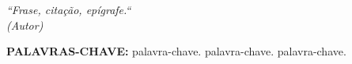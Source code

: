 \documentclass[
  12pt,		%
  a4paper,	%
  openright,%
  oneside,	%
  chapter=TITLE,		%
  section=TITLE,		%
  english,	%
  french,	%
  spanish,	%
  brazil	%
]{abntex2}
\begin{document}
    
    \begin{epigrafe}
        \vspace*{\fill}
    	\begin{flushright}
    		\textit{
        		``Frase, citação, epígrafe.``\\
        		(Autor)
    		}
    	\end{flushright}
    \end{epigrafe}
    
    
    \begin{resumo}
    
        \lipsum[1] %
        
        \vspace*{0.5cm}
    
        \noindent\textbf{\MakeUppercase{Palavras-Chave: }} palavra-chave. palavra-chave. palavra-chave.
    
    \end{resumo}
    
    
\end{document}
